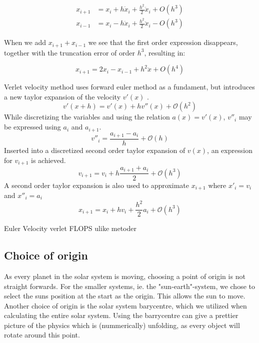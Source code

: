 \begin{align}
x_{i+1} &= x_i + h\dot{x}_i + \frac{h^2}{2} \ddot{x}_i + O(h^3)\\
x_{i-1} &= x_i - h\dot{x}_i + \frac{h^2}{2} \ddot{x}_i - O(h^3)
\end{align}

When we add $x_{i+1} + x_{i-1}  $ we see that the first order expression disappears, together with the truncation error of order $ h^3 $, resulting in: 

\begin{equation}
x_{i+1} = 2x_i -x_{i-1} + h^2 \ddot{x} + O(h^4)
\end{equation}




Verlet velocity method uses forward euler method as a fundament, but introduces a new taylor expansion of the velocity $v'(x)$ .
\begin{equation*}
v'(x+h)=v'(x)+hv''(x)+\mathcal{O}(h^2)
\end{equation*}
While discretizing the variables and using the relation $a(x)=v'(x)$, $v''_i$ may be expressed using $a_i$ and $a_{i+1}$.
\begin{equation*}
v''_i=\frac{a_{i+1}-a_i}{h}+\mathcal{O}(h) 
\end{equation*}
Inserted into a discretized second order taylor expansion of $v(x)$, an expression for $v_{i+1}$ is achieved.
\begin{equation}
v_{i+1}=v_i+h\frac{a_{i+1}+a_i}{2} + \mathcal{O}(h^3)
\end{equation}
A second order taylor expansion is also used to approximate $x_{i+1}$ where $x'_i=v_i$ and $x''_i=a_i$
\begin{equation}
x_{i+1}=x_i+hv_i+\frac{h^2}{2}a_i + \mathcal{O}(h^3)
\end{equation}




Euler
Velocity verlet
FLOPS ulike metoder

\subsection{Choice of origin}

As every planet in the solar system is moving, choosing a point of  origin is not straight forwards. For the smaller systems, ie. the "sun-earth"-system, we chose to select the suns position at the start as the origin. This allows the sun to move. Another choice of origin is the solar system barycentre, which we utilized when calculating the entire solar system. Using the barrycentre can give a prettier picture of the physics which is (nummerically) unfolding, as every object will rotate around this point.



